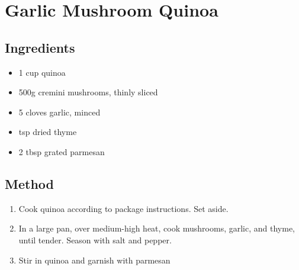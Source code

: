 \clearpage
\section{Garlic Mushroom Quinoa}

\begin{multicols}{2}
  \subsection{Ingredients}
    \begin{itemize}
      \item 1 cup quinoa
      \item 500g cremini mushrooms, thinly sliced
      \item 5 cloves garlic, minced
      \item {} tsp dried thyme
      \item 2 tbsp grated parmesan
    \end{itemize}
  \vfill\null
  \columnbreak
  \subsection{Method}
    \begin{enumerate}
      \item Cook quinoa according to package instructions. Set aside.
      \item In a large pan, over medium-high heat, cook mushrooms, garlic, and thyme, until tender. Season with salt and pepper.
      \item Stir in quinoa and garnish with parmesan
    \end{enumerate}
  \end{multicols}
